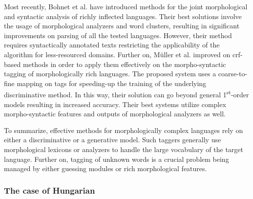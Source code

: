 Most recently, Bohnet et al. have introduced methods \cite{bohnet2013joint} for the joint morphological and syntactic analysis  of richly inflected languages.
Their best solutions involve the usage of morphological analyzers and word clusters, resulting in significant improvements on parsing of all the tested languages.
However, their method requires syntactically annotated texts restricting the applicability of the algorithm for less-resourced domains.
Further on, Müller et al. \cite{mueller2013} improved on \acrshort{crf}-based methods in order to apply them effectively on the morpho-syntactic tagging of morphologically rich languages.
The proposed system uses a coarse-to-fine mapping on tags for speeding-up the training of the underlying discriminative method.
In this way, their solution can go beyond general 1\textsuperscript{st}-order models resulting in increased accuracy.
Their best systems utilize complex morpho-syntactic features and outputs of morphological analyzers as well.

To summarize, effective methods for morphologically complex languages rely on either a discriminative or a generative model.
Such taggers generally use morphological lexicons or analyzers to handle the large vocabulary of the target language.
Further on, tagging of unknown words is a crucial problem being managed by either guessing modules or rich morphological features. 

\subsubsection{The case of Hungarian}

